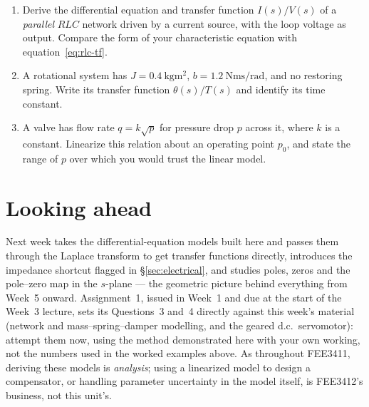 \documentclass[11pt,a4paper]{article}
\begin{document}
\begin{enumerate}
\item Derive the differential equation and transfer function $I(s)/V(s)$ of a
      \emph{parallel} $RLC$ network driven by a current source, with the loop
      voltage as output. Compare the form of your characteristic equation with
      equation~\eqref{eq:rlc-tf}.
\item A rotational system has $J=\SI{0.4}{\kilogram\metre\squared}$,
      $b=\SI{1.2}{\newton\metre\second\per\radian}$, and no restoring spring.
      Write its transfer function $\theta(s)/T(s)$ and identify its time
      constant.
\item A valve has flow rate $q=k\sqrt{p}$ for pressure drop $p$ across it,
      where $k$ is a constant. Linearize this relation about an operating point
      $p_0$, and state the range of $p$ over which you would trust the linear
      model.
\end{enumerate}

\section*{Looking ahead}

Next week takes the differential-equation models built here and passes them
through the Laplace transform to get transfer functions directly, introduces
the impedance shortcut flagged in \S\ref{sec:electrical}, and studies poles,
zeros and the pole--zero map in the $s$-plane --- the geometric picture behind
everything from Week~5 onward. Assignment~1, issued in Week~1 and due at the
start of the Week~3 lecture, sets its Questions~3 and~4 directly against this
week's material (network and mass--spring--damper modelling, and the geared
d.c.\ servomotor): attempt them now, using the method demonstrated here with
your own working, not the numbers used in the worked examples above. As
throughout FEE3411, deriving these models is \emph{analysis}; using a
linearized model to design a compensator, or handling parameter uncertainty in
the model itself, is FEE3412's business, not this unit's.
\end{document}
